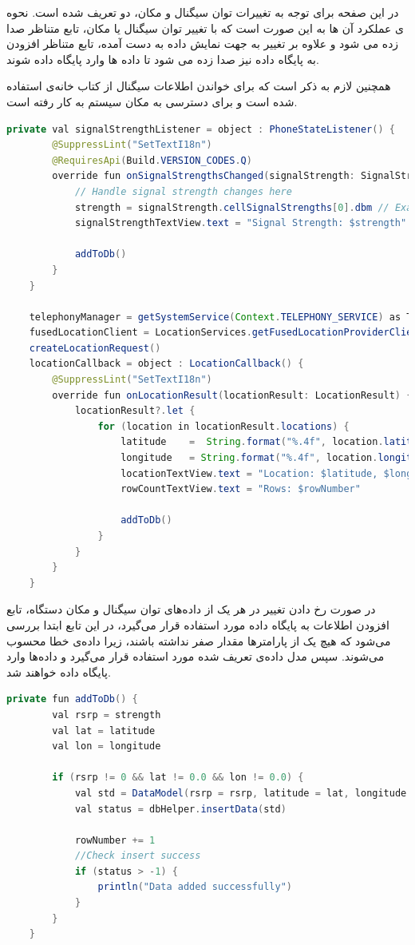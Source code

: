 در این صفحه برای توجه به تغییرات توان سیگنال و مکان، دو  تعریف شده است. نحوه ی عملکرد آن ها به این صورت است که با تغییر توان سیگنال یا مکان،‌ تابع متناظر صدا زده می شود و علاوه بر تغییر  به جهت نمایش داده به دست آمده، تابع متناظر افزودن به پایگاه داده نیز صدا زده می شود تا داده ها وارد پایگاه داده شوند.

همچنین لازم به ذکر است که برای خواندن اطلاعات سیگنال از کتاب خانه‌ی  استفاده شده است و برای دسترسی به مکان سیستم  به کار رفته است.

\begin{lstlisting}[language=Java]
	private val signalStrengthListener = object : PhoneStateListener() {
		@SuppressLint("SetTextI18n")
		@RequiresApi(Build.VERSION_CODES.Q)
		override fun onSignalStrengthsChanged(signalStrength: SignalStrength) {
			// Handle signal strength changes here
			strength = signalStrength.cellSignalStrengths[0].dbm // Example: GSM signal strength
			signalStrengthTextView.text = "Signal Strength: $strength"
			
			addToDb()
		}
	}
	
	telephonyManager = getSystemService(Context.TELEPHONY_SERVICE) as TelephonyManager
	fusedLocationClient = LocationServices.getFusedLocationProviderClient(this)
	createLocationRequest()
	locationCallback = object : LocationCallback() {
		@SuppressLint("SetTextI18n")
		override fun onLocationResult(locationResult: LocationResult) {
			locationResult?.let {
				for (location in locationResult.locations) {
					latitude    =  String.format("%.4f", location.latitude).toDouble()
					longitude   = String.format("%.4f", location.longitude).toDouble()
					locationTextView.text = "Location: $latitude, $longitude"
					rowCountTextView.text = "Rows: $rowNumber"
					
					addToDb()
				}
			}
		}
	}
\end{lstlisting}

در صورت رخ دادن تغییر در هر یک از داده‌های توان سیگنال و مکان دستگاه، تابع افزودن اطلاعات به پایگاه داده مورد استفاده قرار می‌گیرد، در این تابع ابتدا بررسی می‌شود که هیچ یک از پارامترها مقدار صفر نداشته باشند، زیرا داده‌ی خطا محسوب می‌شوند. سپس مدل داده‌ی تعریف شده مورد استفاده قرار می‌گیرد و داده‌ها وارد پایگاه داده خواهند شد.

\begin{lstlisting}[language=Java]
	private fun addToDb() {
		val rsrp = strength
		val lat = latitude
		val lon = longitude
		
		if (rsrp != 0 && lat != 0.0 && lon != 0.0) {
			val std = DataModel(rsrp = rsrp, latitude = lat, longitude = lon)
			val status = dbHelper.insertData(std)
			
			rowNumber += 1
			//Check insert success
			if (status > -1) {
				println("Data added successfully")
			}
		}
	}
\end{lstlisting}

